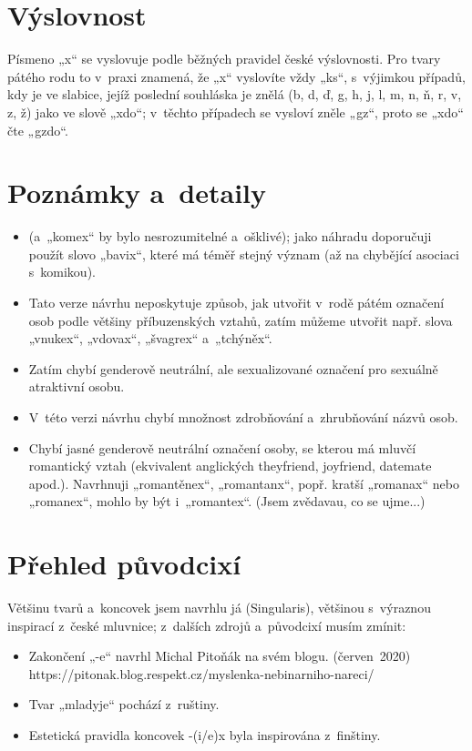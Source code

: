 \section{Výslovnost}
%
Písmeno „x“ se vyslovuje podle běžných pravidel české výslovnosti.
Pro tvary pátého rodu to v praxi znamená, že „x“ vyslovíte vždy „ks“,
s výjimkou případů, kdy je ve slabice, jejíž poslední souhláska je znělá
(b, d, ď, g, h, j, l, m, n, ň, r, v, z, ž) jako ve slově „xdo“;
v těchto případech se vysloví zněle „gz“, proto se „xdo“ čte „gzdo“.

\section{Poznámky a detaily}
\begin{itemize}
\item{} (a „komex“ by bylo nesrozumitelné a ošklivé);
jako náhradu doporučuji použít slovo „bavix“, které má téměř stejný význam (až na chybějící asociaci s komikou).
\item Tato verze návrhu neposkytuje způsob, jak utvořit v rodě pátém označení osob podle většiny příbuzenských vztahů, zatím můžeme utvořit např. slova „vnukex“, „vdovax“, „švagrex“ a „tchýněx“.
\item Zatím chybí genderově neutrální, ale sexualizované označení pro sexuálně atraktivní osobu.
\item V této verzi návrhu chybí množnost zdrobňování a zhrubňování názvů osob.
\item Chybí jasné genderově neutrální označení osoby, se kterou má mluvčí romantický vztah (ekvivalent anglických they\-friend, joy\-friend, date\-mate apod.). Navrhnuji „romantěnex“, „romantanx“, popř. kratší „romanax“ nebo „romanex“, mohlo by být i „romantex“. (Jsem zvědavau, co se ujme...)
\end{itemize}

\section{Přehled původcixí}

Většinu tvarů a koncovek jsem navrhlu já (Singularis), většinou s výraznou
inspirací z české mluvnice; z dalších zdrojů a původcixí musím zmínit:

\begin{itemize}
\item Zakončení „-e“ navrhl Michal Pitoňák na svém blogu. (červen 2020)\\{}https://pitonak.blog.respekt.cz/myslenka-nebinarniho-nareci/
\item Tvar „mladyje“ pochází z ruštiny.
\item Estetická pravidla koncovek -(i/e)x byla inspirována z finštiny.
\end{itemize}

